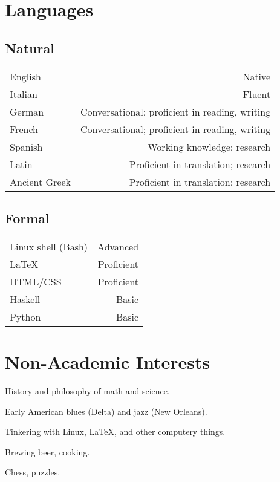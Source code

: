 \documentclass[letterpaper]{article}
\makeatletter
\newcommand{\myvrule}{\color{lightgray}\vrule width 1.0pt}
\newenvironment{cvsection}{%
  \renewcommand{\arraystretch}{1.75}
  \begin{longtable}[l]{@{} L R @{}}
}{%
  \end{longtable}
}
\makeatother
\begin{document}
\section*{Languages}

\vspace{1ex}
\subsection*{Natural}

\begin{cvsection}
  English & Native \\
  Italian & Fluent \\
  German & Conversational; proficient in reading, writing \\
  French & Conversational; proficient in reading, writing \\
  Spanish & Working knowledge; research \\
  Latin & Proficient in translation; research \\
  Ancient Greek & Proficient in translation; research \\
\end{cvsection}

\vspace{-2ex}
\subsection*{Formal}

\begin{cvsection}
  Linux shell {\footnotesize (Bash)} & Advanced \\
  \LaTeX{} & Proficient \\
  HTML/CSS & Proficient \\
  Haskell & Basic \\
  Python & Basic \\
\end{cvsection}



\section*{Non-Academic Interests}

\begin{list}{}{\leftmargin=0pt}
  \item History and philosophy of math and science.
  \item Early American blues (Delta) and jazz (New Orleans).
  \item Tinkering with Linux, \LaTeX{}, and other computery things.
  \item Brewing beer, cooking.
  \item Chess, puzzles.
\end{list}
\end{document}
